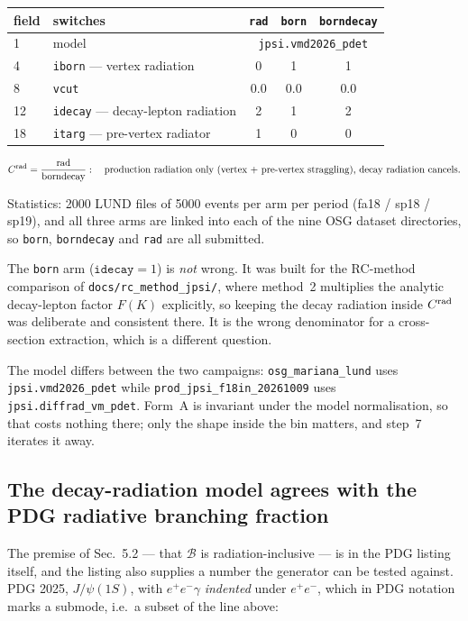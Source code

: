 \documentclass[11pt]{article}
\newcommand{\crad}{C^{\rm rad}}
\newcommand{\BR}{\mathcal{B}}
\begin{document}
\begin{center}
\begin{tabular}{llccc}
\toprule
field & switches & \texttt{rad} & \texttt{born} & \texttt{borndecay} \\
\midrule
1 & model & \multicolumn{3}{c}{\texttt{jpsi.vmd2026\_pdet}} \\
4 & \texttt{iborn} --- vertex radiation & 0 & 1 & 1 \\
8 & \texttt{vcut} & 0.0 & 0.0 & 0.0 \\
12 & \texttt{idecay} --- decay-lepton radiation & 2 & 1 & 2 \\
18 & \texttt{itarg} --- pre-vertex radiator & 1 & 0 & 0 \\
\bottomrule
\end{tabular}
\end{center}

\begin{equation}
\crad=\frac{\mathrm{rad}}{\mathrm{borndecay}}:
\quad\text{production radiation only (vertex $+$ pre-vertex straggling), decay radiation cancels.}
\end{equation}

Statistics: 2000 LUND files of 5000 events per arm per period (fa18 / sp18 / sp19), and all three
arms are linked into each of the nine OSG dataset directories, so \texttt{born},
\texttt{borndecay} and \texttt{rad} are all submitted.

The \texttt{born} arm ($\texttt{idecay}=1$) is \emph{not} wrong. It was built for the RC-method
comparison of \texttt{docs/rc\_method\_jpsi/}, where method~2 multiplies the analytic decay-lepton
factor $F(K)$ explicitly, so keeping the decay radiation inside $\crad$ was deliberate and
consistent there. It is the wrong denominator for a cross-section extraction, which is a different
question.

The model differs between the two campaigns: \texttt{osg\_mariana\_lund} uses
\texttt{jpsi.vmd2026\_pdet} while \texttt{prod\_jpsi\_f18in\_20261009} uses
\texttt{jpsi.diffrad\_vm\_pdet}. Form~A is invariant under the model normalisation, so that costs
nothing there; only the shape inside the bin matters, and step~7 iterates it away.

\subsection{The decay-radiation model agrees with the PDG radiative branching fraction}

The premise of Sec.~5.2 --- that $\BR$ is radiation-inclusive --- is in the PDG listing itself, and
the listing also supplies a number the generator can be tested against. PDG 2025, $J/\psi(1S)$, with
$e^+e^-\gamma$ \emph{indented} under $e^+e^-$, which in PDG notation marks a submode, i.e.\ a subset
of the line above:
\end{document}
